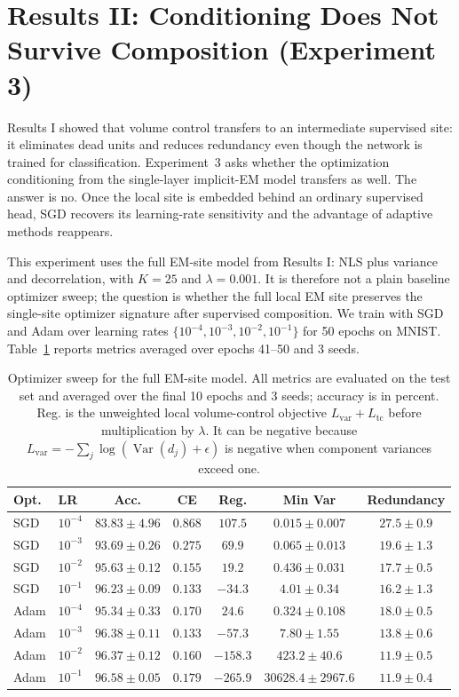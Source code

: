 \section{Results II: Conditioning Does Not Survive Composition (Experiment 3)}
\label{sec:results-conditioning}
Results I showed that volume control transfers to an intermediate supervised
site: it eliminates dead units and reduces redundancy even though the network
is trained for classification. Experiment~3 asks whether the optimization
conditioning from the single-layer implicit-EM model transfers as well. The
answer is no. Once the local site is embedded behind an ordinary supervised
head, SGD recovers its learning-rate sensitivity and the advantage of adaptive
methods reappears.

This experiment uses the full EM-site model from Results I: NLS plus variance
and decorrelation, with $K=25$ and $\lambda=0.001$. It is therefore not a
plain baseline optimizer sweep; the question is whether the full local EM site
preserves the single-site optimizer signature after supervised composition. We
train with SGD and Adam over learning rates
$\{10^{-4},10^{-3},10^{-2},10^{-1}\}$ for 50 epochs on MNIST.
Table~\ref{tab:optimizer-sweep} reports metrics averaged over epochs 41--50
and 3 seeds.
\begin{table}[h]
\centering
\begin{tabular}{llccccc}
\toprule
Opt. & LR & Acc. & CE & Reg. & Min Var & Redundancy \\
\midrule
SGD & $10^{-4}$ & $83.83\pm4.96$ & $0.868$ & $107.5$ & $0.015\pm0.007$ & $27.5\pm0.9$ \\
SGD & $10^{-3}$ & $93.69\pm0.26$ & $0.275$ & $69.9$ & $0.065\pm0.013$ & $19.6\pm1.3$ \\
SGD & $10^{-2}$ & $95.63\pm0.12$ & $0.155$ & $19.2$ & $0.436\pm0.031$ & $17.7\pm0.5$ \\
SGD & $10^{-1}$ & $96.23\pm0.09$ & $0.133$ & $-34.3$ & $4.01\pm0.34$ & $16.2\pm1.3$ \\
Adam & $10^{-4}$ & $95.34\pm0.33$ & $0.170$ & $24.6$ & $0.324\pm0.108$ & $18.0\pm0.5$ \\
Adam & $10^{-3}$ & $96.38\pm0.11$ & $0.133$ & $-57.3$ & $7.80\pm1.55$ & $13.8\pm0.6$ \\
Adam & $10^{-2}$ & $96.37\pm0.12$ & $0.160$ & $-158.3$ & $423.2\pm40.6$ & $11.9\pm0.5$ \\
Adam & $10^{-1}$ & $96.58\pm0.05$ & $0.179$ & $-265.9$ & $30628.4\pm2967.6$ & $11.9\pm0.4$ \\
\bottomrule
\end{tabular}
\caption{Optimizer sweep for the full EM-site model. All metrics are evaluated
on the test set and averaged over the final 10 epochs and 3 seeds; accuracy is
in percent. Reg. is the unweighted local volume-control objective
$L_{\mathrm{var}}+L_{\mathrm{tc}}$ before multiplication by $\lambda$. It can
be negative because
$L_{\mathrm{var}}=-\sum_j\log(\operatorname{Var}(d_j)+\epsilon)$
is negative when component variances exceed one.}
\label{tab:optimizer-sweep}
\end{table}

